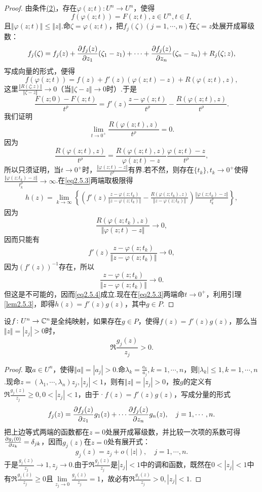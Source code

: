 \begin{proof}
	由条件\hyperlink{2.5.4}{(2)}，存在$\varphi(z;t)\colon U^n\to U^n$，使得
	\[f(\varphi(z;t))=F(z;t),z\in U^n,t\in I,\]
	且$\Vert\varphi(z;t)\Vert\le\Vert z\Vert$.命$\zeta=\varphi(z;t)$，把$f_j(\zeta)(j=1,\cdots,n)$在$\zeta=z$处展开成幂级数：
	\[f_j(\zeta)=f_j(z)+\frac{\partial f_j(z)}{\partial z_1}(\zeta_1-z_1)+\cdots+\frac{\partial f_j(z)}{\partial z_n}(\zeta_n-z_n)+R_j(\zeta;z),\]
	写成向量的形式，便得
	\[f(\varphi(z;t))=f(z)+f'(z)(\varphi(z;t)-z)+R(\varphi(z;t),z),\]
	这里$\frac{\Vert R(\zeta;z)\Vert}{\Vert\zeta-z\Vert}\to0$（当$\Vert\zeta-z\Vert\to0$时）.于是
	\begin{equation}\label{eq2.5.3}
		\frac{F(z;0)-F(z;t)}{t^\rho}
		=f'(z)\frac{z-\varphi(z;t)}{t^\rho}-\frac{R(\varphi(z;t),z)}{t^\rho}.
	\end{equation}
我们证明
\begin{equation}\label{eq2.5.4}
	\lim_{t\to 0^+}\frac{R(\varphi(z;t),z)}{t^\rho}=0.
\end{equation}
因为
\[\frac{R(\varphi(z;t),z)}{t^\rho}=\frac{R(\varphi(z;t),z)}{\varphi(z;t)-z}\frac{\varphi(z;t)-z}{t^\rho},\]
所以只须证明，当$t\to0^+$时，$\frac{\Vert\varphi(z;t)-z\Vert}{t^\rho}$有界.若不然，则存在$\{t_k\},t_k\to0^+$使得$\frac{\Vert\varphi(z;t_k)-z\Vert}{t_k^\rho}\to\infty$.在\eqref{eq2.5.3}两端取极限得
\begin{align*}
	h(z)=\lim_{k\to\infty}\left\{\left(f'(z)\frac{z-\varphi(z;t_k)}{\Vert z-\varphi(z;t_k)\Vert}-\frac{R(\varphi(z;t_k),z)}{\Vert z-\varphi(z;t_k)\Vert}\right)\frac{\Vert \varphi(z;t_k)-z\Vert}{t_k^\rho}\right\},
\end{align*}
因为
\[\frac{R(\varphi(z;t_k),z)}{\Vert\varphi(z;t)-z\Vert}\to0,\]
因而只能有
\[f'(z)\frac{z-\varphi(z;t_k)}{\Vert z-\varphi(z;t_k)\Vert}\to0,\]
因为$(f'(z))^{-1}$存在，所以
\[\frac{z-\varphi(z;t_k)}{\Vert z-\varphi(z;t_k)\Vert}\to0.\]
但这是不可能的，因而\eqref{eq2.5.4}成立.现在在\eqref{eq2.5.3}两端命$t\to 0^+$，利用引理\ref{lem2.5.3}，即得$h(z)=f'(z)g(z)$，其中$g\in P$.
\end{proof}
\begin{lemma}\label{lem2.5.5}
	设$f\colon U^n\to\mathbb C^n$是全纯映射，如果存在$g\in P$，使得$f(z)=f'(z)g(z)$，那么当$\Vert z\Vert=|z_j|>0$时，
	\[\Re \frac{g_j(z)}{z_j}>0.\]
\end{lemma}
\begin{proof}
	取$a\in U^n$，使得$\Vert a\Vert=|a_j|>0$.命$\lambda_k=\frac{a_k}{a_j},k=1,\cdots,n$，则$|\lambda_k|\le1,k=1,\cdots,n$.现命$z=(\lambda_1,\cdots,\lambda_n)z_j,|z_j|<1$，则有$\Vert z\Vert=|z_j|>0$，按$g$的定义有$\Re\frac{g_j(z)}{z_j}\ge0,0<|z_j|<1$，由于·$f(z)=f'(z)g(z)$，写成分量的形式
	\[f_j(z)=\frac{\partial f_j(z)}{\partial z_1}g_1(z)+\cdots\frac{\partial f_j(z)}{\partial z_n}g_n(z),\quad j=1,\cdots,n.\]
	把上边等式两端的函数都在$z=0$处展开成幂级数，并比较一次项的系数可得$\frac{\partial g_j(0)}{\partial z_k}=\delta_{jk}$，因而$g_j(z)$在$z=0$处有展开式：
	\[g_j(z)=z_j+o(|z|),\quad j=1,\cdots,n.\]
	于是$\frac{g_j(z)}{z_j}\to1,z_j\to0$.由于$\Re\frac{g_j(z)}{z_j}$是$|z_j|<1$中的调和函数，既然在$0<|z_j|<1$中有$\Re\frac{g_j(z)}{z_j}\ge0$且$\lim\limits_{z_j\to0}\frac{g_j(z)}{z_j}=1$，故必有$\Re\frac{g_j(z)}{z_j}>0,|z_j|<1$.
\end{proof}
